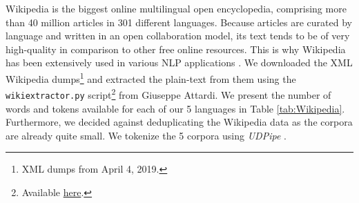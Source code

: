 \begin{table}[t!]
    \centering\small
    \caption{Size of Wikipedia corpora, measured in bytes, thousands of tokens, words and sentences.}
    \label{tab:Wikipedia}
\end{table}

Wikipedia is the biggest online multilingual open encyclopedia, comprising more than 40 million articles in 301 different languages. Because articles are curated by language and written in an open collaboration model, its text tends to be of very high-quality in comparison to other free online resources. This is why Wikipedia has been extensively used in various NLP applications \citep{wu-weld-2010-open,mihalcea-2007-using,al-rfou-etal-2013-polyglot,bojanowski-etal-2017-enriching}. We downloaded the XML Wikipedia dumps\footnote{XML dumps from April 4, 2019.} and extracted the plain-text from them using the \texttt{wikiextractor.py} script\footnote{Available \href{https://github.com/attardi/wikiextractor}{here}.} from Giuseppe Attardi. We present the number of words and tokens available for each of our 5 languages in Table \ref{tab:Wikipedia}. Furthermore, we decided against deduplicating the Wikipedia data as the corpora are already quite small. We tokenize the 5 corpora using \emph{UDPipe} \citep{straka-strakova-2017-tokenizing}.

